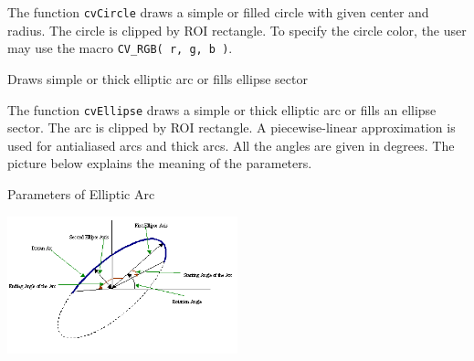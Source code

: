 The function \texttt{cvCircle} draws a simple or filled circle with
given center and radius. The circle is clipped by ROI rectangle.
To specify the circle color, the user may use the macro
\texttt{CV\_RGB( r, g, b )}.

\label{Ellipse}

Draws simple or thick elliptic arc or fills ellipse sector


\begin{description}
\end{description}

The function \texttt{cvEllipse} draws a simple or thick elliptic
arc or fills an ellipse sector. The arc is clipped by ROI rectangle.
A piecewise-linear approximation is used for antialiased arcs and
thick arcs. All the angles are given in degrees. The picture below
explains the meaning of the parameters.

Parameters of Elliptic Arc

\includegraphics[width=0.5\textwidth]{pics/ellipse.png}

